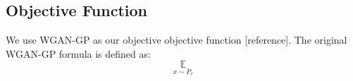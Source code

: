 \subsection{Objective Function}
We use WGAN-GP as our objective objective function [reference]. The original WGAN-GP formula is defined as:
\begin{equation}
\underset{x \sim P_r}{\mathbb{E}}
\end{equation}
